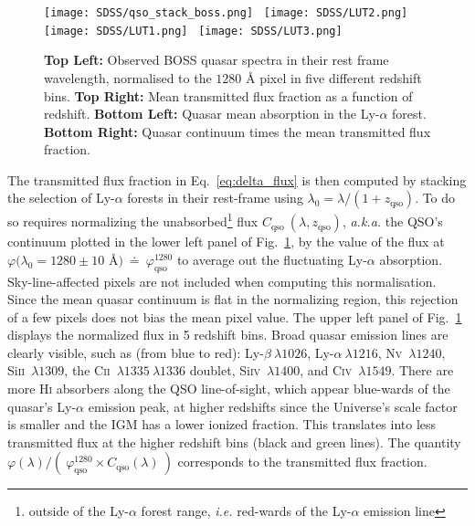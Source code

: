 \begin{figure}
\begin{center}
\texttt{[image: SDSS/qso\_stack\_boss.png]}~%
\texttt{[image: SDSS/LUT2.png]}
\texttt{[image: SDSS/LUT1.png]}~%
\texttt{[image: SDSS/LUT3.png]}
\caption{\textbf{Top Left:} Observed BOSS quasar spectra in their rest frame wavelength, normalised to the $1280$ {\AA} pixel in five different redshift bins. \textbf{Top Right:} Mean transmitted flux fraction as a function of redshift. \textbf{Bottom Left:} Quasar mean absorption in the Ly-$\alpha$ forest. \textbf{Bottom Right:} Quasar continuum times the mean transmitted flux fraction.}
\label{fig:LUT}
\end{center}
\end{figure}

The transmitted flux fraction in Eq.~\ref{eq:delta_flux} is then computed by stacking the selection of Ly-$\alpha$ forests in their rest-frame using $\lambda_0 = \lambda / (1 + z_\mathrm{qso})$. To do so requires normalizing the unabsorbed\footnote{outside of the Ly-$\alpha$ forest range, \textit{i.e.} red-wards of the Ly-$\alpha$ emission line} flux $C_\mathrm{qso}~(\lambda, z_\mathrm{qso})$, \textit{a.k.a.} the QSO's continuum plotted in the lower left panel of Fig.~\ref{fig:LUT}, by the value of the flux at $\varphi (\lambda_0 = 1280 \pm 10$ {\AA}$)~\doteq ~\varphi_{\mathrm{qso}}^{1280}$ to average out the fluctuating Ly-$\alpha$ absorption. Sky-line-affected pixels are not included when computing this normalisation. Since  the mean quasar continuum is flat in the normalizing region, this rejection of a few pixels does not bias the mean pixel value. The upper left panel of Fig.~\ref{fig:LUT} displays the normalized flux in 5 redshift bins. Broad quasar emission lines are clearly visible, such as (from blue to red): Ly-$\beta~\lambda 1026$, Ly-$\alpha~\lambda 1216$, N\textsc{v}~$\lambda 1240$, Si\textsc{ii}~$\lambda 1309$, the C\textsc{ii}~$\lambda 1335~\lambda 1336$ doublet, Si\textsc{iv}~$\lambda 1400$, and C\textsc{iv}~$\lambda 1549$. There are more \textsc{Hi} absorbers along the QSO line-of-sight, which appear blue-wards of the quasar's Ly-$\alpha$ emission peak, at higher redshifts since the Universe's scale factor is smaller and the IGM has a lower ionized fraction. This translates into less transmitted flux at the higher redshift bins (black and green lines). The quantity $\varphi (\lambda) / (~\varphi_{\mathrm{qso}}^{1280} \times  C_\mathrm{qso}(\lambda) ~)$ corresponds to the transmitted flux fraction. \\

